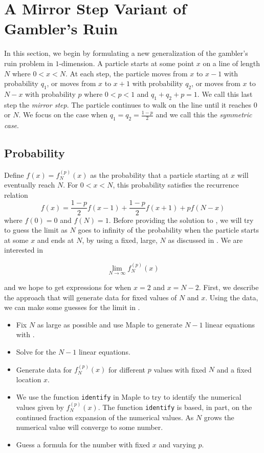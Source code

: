\documentclass[reqno]{amsart}
\theoremstyle{definition}
\theoremstyle{definition}
\theoremstyle{remark}
\begin{document}
\section{A Mirror Step Variant of Gambler's Ruin}\label{sec:mirror step}

In this section, we begin by formulating a new generalization of the gambler's ruin problem in $1$-dimension. A particle starts at some point $x$ on a line of length $N$ where $0< x <N$. At each step, the particle moves from $x$ to $x-1$ with probability $q_1$, or moves from $x$ to $x+1$ with probability $q_2$, or moves from $x$ to $N-x$ with probability $p$ where $0<p<1$ and $q_1+q_2+p=1$. We call this last step the \textit{mirror step}. The particle continues to walk on the line until it reaches $0$ or $N$. We focus on the case when $q_1=q_2=\frac{1-p}{2}$ and we call this the \textit{symmetric case}.


\subsection{Probability}
Define $f(x)=f_N^{(p)}(x)$ as the probability that a particle starting at $x$ will eventually reach $N$. For $0<x<N$, this probability satisfies the recurrence relation
\begin{equation} \label{eq:prob recurrence mirror}
    f(x)=\frac{1-p}{2}f(x-1)+\frac{1-p}{2}f(x+1)+pf(N-x)
\end{equation}
where $f(0)=0$ and $f(N)=1$. Before providing the solution to , we will try to guess the limit
as $N$ goes to infinity of the probability when the particle starts at some $x$ and ends at $N$, by using a fixed, large,  $N$ as discussed in . We are interested in

\begin{equation}\label{eq:limit of fN(x)}
    \lim_{N\to \infty} f_N^{(p)}(x)
\end{equation}

and we hope to get expressions for when $x=2$ and $x=N-2$. First, we describe the approach that will generate data for fixed values of $N$ and $x$. Using the data, we can make some guesses for the limit in .

\begin{itemize}[leftmargin=0.2 in]
    \item Fix $N$ as large as possible and use Maple to generate $N-1$ linear equations with .
    \item Solve for the $N-1$ linear equations.
    \item Generate data for $f_N^{(p)}(x)$ for different $p$ values with fixed $N$ and a fixed location $x$. 
    \item We use the function \texttt{identify} in Maple to try to identify the numerical values given by $f_N^{(p)}(x)$. The function \texttt{identify} is based, in part, on the continued fraction expansion of the numerical values. As $N$ grows the numerical value will converge to some number.
    \item Guess a formula for the number with fixed $x$ and varying $p$.
\end{itemize}
\end{document}
